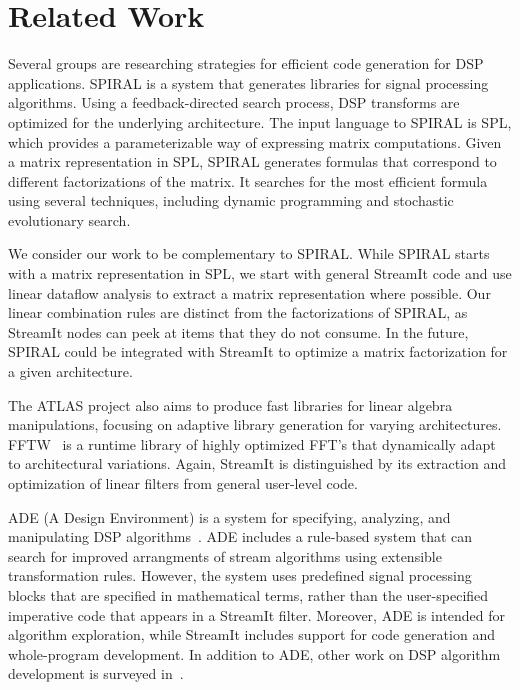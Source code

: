\section{Related Work}
\label{sec:related}

Several groups are researching strategies for efficient code
generation for DSP applications.  SPIRAL is a system that generates
libraries for signal processing
algorithms\cite{spiral,johnson01searching,egner01automatic}.  Using a
feedback-directed search process, DSP transforms are optimized for the
underlying architecture.  The input language to SPIRAL is
SPL\cite{xiong01spl,xiong-thesis}, which provides a parameterizable
way of expressing matrix computations.  Given a matrix representation
in SPL, SPIRAL generates formulas that correspond to different
factorizations of the matrix.  It searches for the most efficient
formula using several techniques, including dynamic programming and
stochastic evolutionary search.

We consider our work to be complementary to SPIRAL.  While SPIRAL
starts with a matrix representation in SPL, we start with general
StreamIt code and use linear dataflow analysis to extract a matrix
representation where possible.  Our linear combination rules are
distinct from the factorizations of SPIRAL, as StreamIt nodes can peek
at items that they do not consume.  In the future, SPIRAL could be
integrated with StreamIt to optimize a matrix factorization for a
given architecture.

The ATLAS project \cite{whaley01automated} also aims to produce fast
libraries for linear algebra manipulations, focusing on adaptive
library generation for varying architectures.  FFTW~\cite{frigo99fast}
is a runtime library of highly optimized FFT's that dynamically adapt
to architectural variations.  Again, StreamIt is distinguished by its
extraction and optimization of linear filters from general user-level
code.

ADE (A Design Environment) is a system for specifying, analyzing, and
manipulating DSP algorithms~\cite{covell-ade}.  ADE includes a
rule-based system that can search for improved arrangments of stream
algorithms using extensible transformation rules.  However, the system
uses predefined signal processing blocks that are specified in
mathematical terms, rather than the user-specified imperative code
that appears in a StreamIt filter.  Moreover, ADE is intended for
algorithm exploration, while StreamIt includes support for code
generation and whole-program development.  In addition to ADE, other
work on DSP algorithm development is surveyed
in~\cite{oppenheim-symbolic}.

